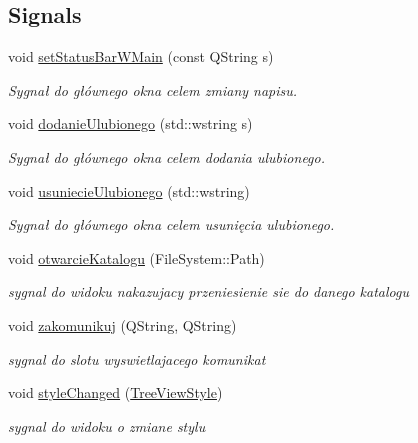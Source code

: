\subsection*{Signals}
\begin{DoxyCompactItemize}
\item 
void \hyperlink{class_file_system_controller_abc6524041d387f97fe5e0ea51ba72a4c}{setStatusBarWMain} (const QString s)
\begin{DoxyCompactList}\small\item\em Sygnał do głównego okna celem zmiany napisu. \item\end{DoxyCompactList}\item 
void \hyperlink{class_file_system_controller_aedbf87ba54a1be56d3121f655fceb5a6}{dodanieUlubionego} (std::wstring s)
\begin{DoxyCompactList}\small\item\em Sygnał do głównego okna celem dodania ulubionego. \item\end{DoxyCompactList}\item 
void \hyperlink{class_file_system_controller_a045c2c7b75d806e82f6885c17a671b77}{usuniecieUlubionego} (std::wstring)
\begin{DoxyCompactList}\small\item\em Sygnał do głównego okna celem usunięcia ulubionego. \item\end{DoxyCompactList}\item 
void \hyperlink{class_file_system_controller_ad7152e32c82c24192669991645d64dc5}{otwarcieKatalogu} (FileSystem::Path)
\begin{DoxyCompactList}\small\item\em sygnal do widoku nakazujacy przeniesienie sie do danego katalogu \item\end{DoxyCompactList}\item 
void \hyperlink{class_file_system_controller_a6c97cfdc63a417b5e9ac4b8eb4cd3412}{zakomunikuj} (QString, QString)
\begin{DoxyCompactList}\small\item\em sygnal do slotu wyswietlajacego komunikat \item\end{DoxyCompactList}\item 
void \hyperlink{class_file_system_controller_a615fb86d9ec66cab58f5c3c74307000d}{styleChanged} (\hyperlink{class_tree_view_style}{TreeViewStyle})
\begin{DoxyCompactList}\small\item\em sygnal do widoku o zmiane stylu \item\end{DoxyCompactList}\end{DoxyCompactItemize}
